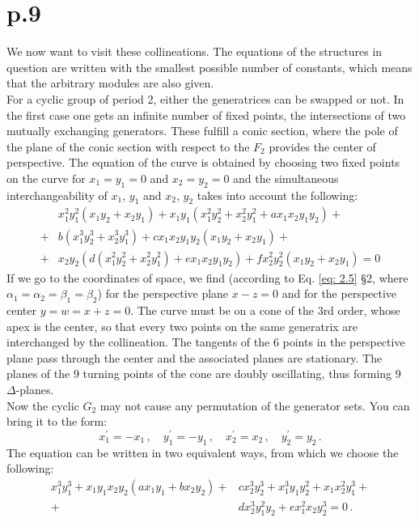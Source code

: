 \documentclass[leqno]{article}
\begin{document}
\section{p.9}
We now want to visit these collineations. The equations of the structures in question are written with the smallest possible number of constants, which means that the arbitrary modules are also given. \\
For a cyclic group of period 2, either the generatrices can be swapped or not. In the first case one gets an infinite number of fixed points, the intersections of two mutually exchanging generators. These fulfill a conic section, where the pole of the plane of the conic section with respect to the $F_2$ provides the center of perspective. The equation of the curve is obtained by choosing two fixed points on the curve for $x_1 = y_1 = 0$ and $x_2 = y_2 = 0$ and the simultaneous interchangeability of $x_1$, $y_1$ and $x_2 $, $y_2$ takes into account the following:
\begin{align}\label{eq: 3.1}
 & x_1^2 y_1^2 (x_1 y_2 + x_2 y_1) + x_1 y_1(x_1^2 y_2^2 + x_2^2 y_1^2 + a x_1 x_2 y_1 y_2) + \nonumber \\
 +& b(x_1^3 y_2^3 + x_2^3 y_1^3) + c x_1 x_2 y_1 y_2 (x_1 y_2 + x_2 y_1) +  \tag{1}\\
 +& x_2 y_2 (d(x_1^2 y_2^2 + x_2^2 y_1^2) + ex_1 x_2 y_1 y_2) + f x_2^2 y_2^2  (x_1 y_2 + x_2 y_1) =0 \nonumber
\end{align}
If we go to the coordinates of space, we find (according to Eq. \eqref{eq: 2.5} \S 2, where $\alpha_1 = \alpha_2 = \beta_1 = \beta_2$) for the perspective plane $x-z=0$ and for the perspective center $y=w=x+z=0$. The curve must be on a cone of the 3rd order, whose apex is the center, so that every two points on the same generatrix are interchanged by the collineation. The tangents of the 6 points in the perspective plane pass through the center and the associated planes are stationary. The planes of the 9 turning points of the cone are doubly oscillating, thus forming 9 $\Delta$-planes. \\
Now the cyclic $G_2$ may not cause any permutation of the generator sets. You can bring it to the form:
\[
x_1^\prime = -x_1 \, , \quad y_1^\prime = - y_1 \, , \quad x_2^\prime = x_2 \, , \quad y_2^\prime = y_2 \, .   
\]
The equation can be written in two equivalent ways, from which we choose the following:
\begin{align}\label{eq: 3.2}
	x_1^3 y_1^3 + x_1 y_1 x_2 y_2 (ax_1 y_1 + b x_2 y_2) +& c x_2^3 y_2^3 +x_1^3 y_1 y_2^2 + x_1 x_2^2 y_1^3 + \tag{2} \\ 
	+& d x_2^3 y_1^2 y_2 + e x_1^2 x_2 y_2^3 = 0 \, .  \nonumber 
\end{align}
\end{document}
